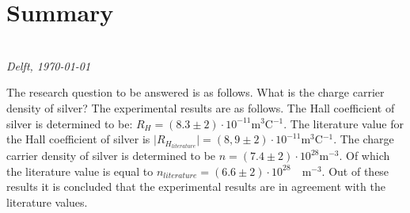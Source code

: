 \chapter*{Summary}


\begin{flushright}
{\makeatletter\itshape
    \@author \\
    Delft, \today
\makeatother}
\end{flushright}

The research question to be answered is as follows. What is the charge carrier density of silver? The experimental results are as follows. The Hall coefficient of silver is determined to be:
        $R_H = (8.3 \pm 2) \cdot 10^{-11} \text{m$^3$C$^{-1}$}$. 
The literature value for the Hall coefficient of silver is \cite{apparatus_silver}
        $ \mid R_{H}_{ literature} \mid = (8,9 \pm 2) \cdot 10^{-11}
        \text{m$^3$C$^{-1}$}$.
The charge carrier density of silver is determined to be
$
        n = (7.4 \pm 2)\cdot 10^{28} \text{m$^{-3}$}.
$
Of which the literature value is equal to \cite{apparatus_silver}
$
        n_{literature} = (6.6 \pm 2)\cdot 10^{28} \quad \text{m$^{-3}$}.
$
Out of these results it is concluded that the experimental results are in agreement with the literature values.